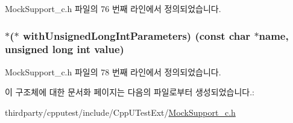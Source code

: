 Mock\+Support\+\_\+c.\+h 파일의 76 번째 라인에서 정의되었습니다.

\subsubsection[{\texorpdfstring{with\+Unsigned\+Long\+Int\+Parameters}{withUnsignedLongIntParameters}}]{$\ast$($\ast$ with\+Unsigned\+Long\+Int\+Parameters) (const char $\ast$name, unsigned long int value)}\hypertarget{struct_s_mock_actual_call__c_a2afa0cf5bfbd2f388afe51f6fb3ff618}{}\label{struct_s_mock_actual_call__c_a2afa0cf5bfbd2f388afe51f6fb3ff618}


Mock\+Support\+\_\+c.\+h 파일의 78 번째 라인에서 정의되었습니다.



이 구조체에 대한 문서화 페이지는 다음의 파일로부터 생성되었습니다.\+:\begin{DoxyCompactItemize}
\item 
thirdparty/cpputest/include/\+Cpp\+U\+Test\+Ext/\hyperlink{_mock_support__c_8h}{Mock\+Support\+\_\+c.\+h}\end{DoxyCompactItemize}
